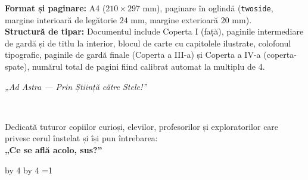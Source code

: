 \documentclass[11pt,a4paper,twoside,openany]{book}
\newcounter{orbitartmp}
\newcommand{\orbitarPadToModFour}[1]{%
  \clearpage
  \loop
    \setcounter{orbitartmp}{\value{page}}%
    \divide\value{orbitartmp} by 4\relax
    \multiply\value{orbitartmp} by 4\relax
    \setcounter{orbitartmp}{\numexpr\value{page}-\value{orbitartmp}\relax}%
  \ifnum\value{orbitartmp}=#1\relax
  \else
    \thispagestyle{empty}\mbox{}\clearpage
  \repeat
}
\begin{document}
\vspace{0.3cm}
\begin{tcolorbox}[orbitarlightyear, title={\textbf{Specificații Tehnice pentru Tipărire (Print-on-Demand / Blurb.com PDF-to-Book)}}]
\small
\textbf{Format și paginare:} A4 ($210 \times 297\text{ mm}$), paginare în oglindă (\texttt{twoside}, margine interioară de legătorie $24\text{ mm}$, margine exterioară $20\text{ mm}$).\\[2pt]
\textbf{Structură de tipar:} Documentul include Coperta I (față), paginile intermediare de gardă și de titlu la interior, blocul de carte cu capitolele ilustrate, colofonul tipografic, paginile de gardă finale (Coperta a III-a) și Coperta a IV-a (coperta-spate), numărul total de pagini fiind calibrat automat la multiplu de 4.
\end{tcolorbox}
\vfill
\clearpage

\thispagestyle{empty}
\vspace*{7.0cm}
\begin{center}
  {\color{orbitarDeepBlue}\Large\itshape „Ad Astra — Prin Știință către Stele!”}\\[0.5cm]
  \\[0.5cm]
  \parbox{0.75\textwidth}{\centering\large\color{orbitarMuted}
  Dedicată tuturor copiilor curioși, elevilor, profesorilor și exploratorilor care privesc cerul înstelat și își pun întrebarea:\\[0.3cm]
  {\color{orbitarDeepBlue}\bfseries „Ce se află acolo, sus?”}}
\end{center}
\vfill
\clearpage

\thispagestyle{empty}
\mbox{}
\clearpage

\tableofcontents

\orbitarPadToModFour{1}

\mainmatter








\end{document}
